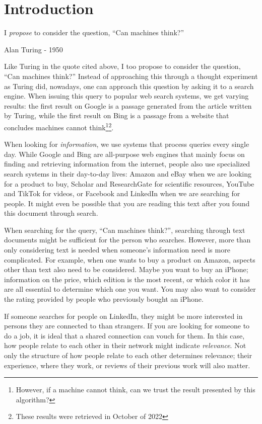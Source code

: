 \chapter{Introduction}
\label{chp:introduction}
\epigraph{I \textit{propose} to consider the question, ``Can machines think?''}{Alan Turing - 1950}

Like Turing in the quote cited above, I too propose to consider the question, ``Can machines think?'' Instead of approaching this through a thought experiment as Turing did, nowadays, one can approach this question by asking it to a search engine. When issuing this query to popular web search systems, we get varying results: the first result on Google is a passage generated from the article written by Turing, while the first result on Bing is a passage from a website that concludes machines cannot think\footnote{However, if a machine cannot think, can we trust the result presented by this algorithm?}\footnote{These results were retrieved in October of 2022}.

When looking for \textit{information}, we use systems that process queries every single day. While Google and Bing are all-purpose web engines that mainly focus on finding and retrieving information from the internet, people also use specialized search systems in their day-to-day lives: Amazon and eBay when we are looking for a product to buy, Scholar and ResearchGate for scientific resources, YouTube and TikTok for videos, or Facebook and LinkedIn when we are searching for people. It might even be possible that you are reading this text after you found this document through search. 

When searching for the query, ``Can machines think?'', searching through text documents might be sufficient for the person who searches. However, more than only considering text is needed when someone's information need is more complicated. For example, when one wants to buy a product on Amazon, aspects other than text also need to be considered. Maybe you want to buy an iPhone; information on the price, which edition is the most recent, or which color it has are all essential to determine which one you want. You may also want to consider the rating provided by people who previously bought an iPhone.

If someone searches for people on LinkedIn, they might be more interested in persons they are connected to than strangers. If you are looking for someone to do a job, it is ideal that a shared connection can vouch for them. In this case, how people relate to each other in their network might indicate \textit{relevance}. Not only the structure of how people relate to each other determines relevance; their experience, where they work, or reviews of their previous work will also matter.

